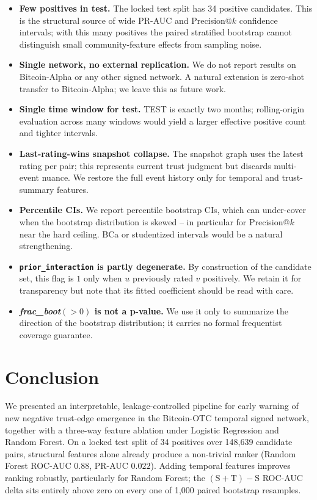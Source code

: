 \documentclass[conference]{IEEEtran}
\newcommand{\code}[1]{\texttt{#1}}
\begin{document}
\begin{itemize}
\item \textbf{Few positives in test.} The locked test split has 34
positive candidates. This is the structural source of wide PR-AUC and
Precision@$k$ confidence intervals; with this many positives the
paired stratified bootstrap cannot distinguish small community-feature
effects from sampling noise.
\item \textbf{Single network, no external replication.} We do not
report results on Bitcoin-Alpha or any other signed network. A
natural extension is zero-shot transfer to Bitcoin-Alpha; we leave
this as future work.
\item \textbf{Single time window for test.} TEST is exactly two
months; rolling-origin evaluation across many windows would yield a
larger effective positive count and tighter intervals.
\item \textbf{Last-rating-wins snapshot collapse.} The snapshot graph
uses the latest rating per pair; this represents current trust
judgment but discards multi-event nuance. We restore the full event
history only for temporal and trust-summary features.
\item \textbf{Percentile CIs.} We report percentile bootstrap CIs,
which can under-cover when the bootstrap distribution is skewed -- in
particular for Precision@$k$ near the hard ceiling. BCa or
studentized intervals would be a natural strengthening.
\item \textbf{\code{prior\_interaction} is partly degenerate.} By
construction of the candidate set, this flag is $1$ only when $u$
previously rated $v$ positively. We retain it for transparency but
note that its fitted coefficient should be read with care.
\item \textbf{\emph{frac\_boot}$(>0)$ is not a p-value.} We use it
only to summarize the direction of the bootstrap distribution; it
carries no formal frequentist coverage guarantee.
\end{itemize}

\section{Conclusion}

We presented an interpretable, leakage-controlled pipeline for early
warning of new negative trust-edge emergence in the Bitcoin-OTC
temporal signed network, together with a three-way feature ablation
under Logistic Regression and Random Forest. On a locked test split
of 34 positives over 148{,}639 candidate pairs, structural features
alone already produce a non-trivial ranker (Random Forest ROC-AUC
$0.88$, PR-AUC $0.022$). Adding temporal features improves ranking
robustly, particularly for Random Forest; the
$(\mathrm{S}{+}\mathrm{T}) - \mathrm{S}$ ROC-AUC delta sits entirely
above zero on every one of 1{,}000 paired bootstrap resamples.
\end{document}
